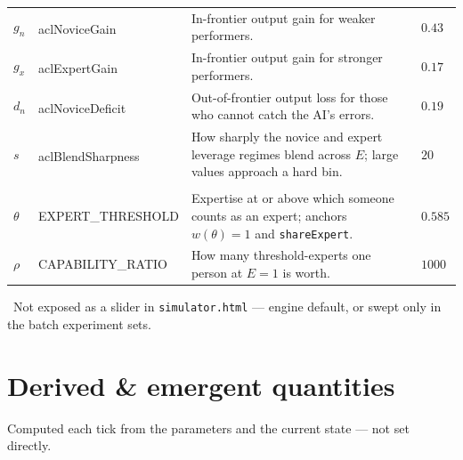 \documentclass[11pt]{article}
\newcommand{\dg}{\textsuperscript{\dag}}
\begin{document}
\begin{longtable}{L{1.6cm} K{2.9cm} L{6.8cm} S{2.5cm}}
$g_n$ & aclNoviceGain\dg & In-frontier output gain for weaker performers.
  & $0.43$ \\
$g_x$ & aclExpertGain\dg & In-frontier output gain for stronger performers.
  & $0.17$ \\
$d_n$ & aclNoviceDeficit\dg & Out-of-frontier output loss for those who cannot
  catch the AI's errors.
  & $0.19$ \\
$s$ & aclBlendSharpness\dg & How sharply the novice and expert leverage regimes
  blend across $E$; large values approach a hard bin.
  & $20$ \\
\addlinespace
{}\\[2pt]
$\theta$ & EXPERT\_THRESHOLD & Expertise at or above which someone counts as an
  expert; anchors $w(\theta) = 1$ and \texttt{shareExpert}.
  & $0.585$ \\
$\rho$ & CAPABILITY\_RATIO & How many threshold-experts one person at $E = 1$ is
  worth.
  & $1000$ \\
\end{longtable}

\normalsize
{\footnotesize\noindent\dag\ Not exposed as a slider in \texttt{simulator.html}
--- engine default, or swept only in the batch experiment sets.\par}

\section{Derived \& emergent quantities}

\noindent Computed each tick from the parameters and the current state --- not
set directly.
\end{document}
